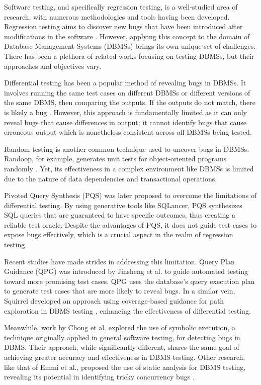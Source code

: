 \documentclass[sigconf]{acmart}
\begin{document}
Software testing, and specifically regression testing, is a well-studied area of research, with numerous methodologies and tools having been developed. Regression testing aims to discover new bugs that have been introduced after modifications in the software \cite{yoo2012regression}. However, applying this concept to the domain of Database Management Systems (DBMSs) brings its own unique set of challenges. There has been a plethora of related works focusing on testing DBMSs, but their approaches and objectives vary.

Differential testing has been a popular method of revealing bugs in DBMSs. It involves running the same test cases on different DBMSs or different versions of the same DBMS, then comparing the outputs. If the outputs do not match, there is likely a bug \cite{slutz1998massive}. However, this approach is fundamentally limited as it can only reveal bugs that cause differences in output; it cannot identify bugs that cause erroneous output which is nonetheless consistent across all DBMSs being tested.

Random testing is another common technique used to uncover bugs in DBMSs. Randoop, for example, generates unit tests for object-oriented programs randomly \cite{pacheco2007randoop}. Yet, its effectiveness in a complex environment like DBMSs is limited due to the nature of data dependencies and transactional operations.

Pivoted Query Synthesis (PQS) \cite{rigger2020testing} was later proposed to overcome the limitations of differential testing. By using generative tools like SQLancer, PQS synthesizes SQL queries that are guaranteed to have specific outcomes, thus creating a reliable test oracle. Despite the advantages of PQS, it does not guide test cases to expose bugs effectively, which is a crucial aspect in the realm of regression testing.

Recent studies have made strides in addressing this limitation. Query Plan Guidance (QPG) was introduced by Jinsheng et al. \cite{jinsheng2023query} to guide automated testing toward more promising test cases. QPG uses the database's query execution plan to generate test cases that are more likely to reveal bugs. In a similar vein, Squirrel developed an approach using coverage-based guidance for path exploration in DBMS testing \cite{zhong2020squirrel}, enhancing the effectiveness of differential testing.

Meanwhile, work by Chong et al. \cite{chong2023data} explored the use of symbolic execution, a technique originally applied in general software testing, for detecting bugs in DBMS. Their approach, while significantly different, shares the same goal of achieving greater accuracy and effectiveness in DBMS testing. Other research, like that of Emmi et al., proposed the use of static analysis for DBMS testing, revealing its potential in identifying tricky concurrency bugs \cite{emmi2015delay}.
\end{document}
